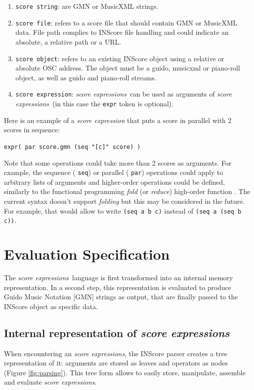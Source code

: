\documentclass{article}
\newcommand{\OSC}[1]{{\fontsize{10pt}{10pt} \selectfont\texttt{#1}}}
\newcommand{\sExpr}{\emph{score expressions}}
\newcommand{\sample}	[1]			{\vspace{-0.2em}\begin{center}\colorbox{mygrey}{\begin{minipage}[t]{0.95\columnwidth} {\small \texttt{#1}}\end{minipage}}\end{center}}
\begin{document}
\begin{enumerate}
\item \OSC{score string}: are GMN or MusicXML strings.
\item \OSC{score file}:  refers to a score file that should contain GMN or MusicXML data. File path complies to INScore file handling and could indicate an absolute, a relative path or a URL.
\item \OSC{score object}:  refers to an existing INScore object using a relative or absolute OSC address. The object must be a guido, musicxml or piano-roll object, as well as guido and piano-roll streams.
\item \OSC{score expression}:  \sExpr\ can be used as arguments of \sExpr\ (in this case the \OSC{expr} token is optional).
\end{enumerate}

Here is an example of a \emph{score expression} that puts a score in parallel with 2 scores in sequence:
\sample{expr( par score.gmn (seq "[c]" score) )}

Note that some operations could take more than 2 scores as arguments. For example, the sequence (\OSC{seq}) or parallel (\OSC{par}) operations could apply to arbitrary lists of arguments and higher-order operations could be defined, similarly to the functional programming \emph{fold} (or \emph{reduce}) high-order function \cite{Hutton99}.
The current syntax doesn't support \emph{folding} but this may be considered in the future. For example, that would allow to write \OSC{(seq a b c)} instead of  \OSC{(seq a (seq b c))}.

\section{Evaluation Specification}
\label{evaluationSpec}
The \sExpr\ language is first transformed into an internal memory representation. In a second step, this representation is evaluated to produce Guido Music Notation [GMN] \cite{hoos98} strings as output, that are finally passed to the INScore object as specific data.

\subsection{Internal representation of \sExpr}

When encountering an \sExpr, the INScore parser creates a tree representation of it: arguments are stored as leaves and operators as nodes (Figure \ref{fig:parsing}). This tree form allows to easily  store, manipulate, assemble and evaluate \sExpr.
\end{document}
